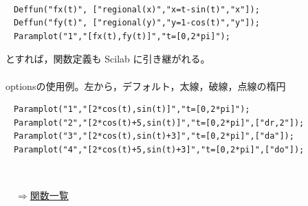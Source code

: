 \documentclass[papersize,a4paper,12pt,uplatex]{jsarticle}
\begin{document}
\begin{description}
\\
\begin{verbatim}
　Deffun("fx(t)", ["regional(x)","x=t-sin(t)","x"]);
　Deffun("fy(t)", ["regional(y)","y=1-cos(t)","y"]);
　Paramplot("1","[fx(t),fy(t)]","t=[0,2*pi]");
\end{verbatim}
とすれば，関数定義も Scilab に引き継がれる。\\
　\\
optionsの使用例。左から，デフォルト，太線，破線，点線の楕円
\begin{verbatim}
　Paramplot("1","[2*cos(t),sin(t)]","t=[0,2*pi]");
　Paramplot("2","[2*cos(t)+5,sin(t)]","t=[0,2*pi]",["dr,2"]);
　Paramplot("3","[2*cos(t),sin(t)+3]","t=[0,2*pi]",["da"]);
　Paramplot("4","[2*cos(t)+5,sin(t)+3]","t=[0,2*pi]",["do"]);
\end{verbatim}

\\

\begin{flushright}　\hyperlink{functionlist}{$\Rightarrow$関数一覧}\end{flushright}


\end{description}
\end{document}
